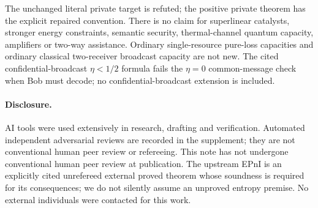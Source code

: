 \documentclass[11pt]{article}
\begin{document}
The unchanged literal private target is refuted; the positive
private theorem has the explicit repaired convention.
There is no claim for superlinear catalysts, stronger energy
constraints, semantic security, thermal-channel quantum
capacity, amplifiers or two-way assistance.
Ordinary single-resource pure-loss capacities and ordinary
classical two-receiver broadcast capacity are not new.
The cited confidential-broadcast $\eta<1/2$ formula fails
the $\eta=0$ common-message check when Bob must decode;
no confidential-broadcast extension is included.

\paragraph{Disclosure.}
AI tools were used extensively in research, drafting and verification.
Automated independent adversarial reviews are recorded in the
supplement; they are not conventional human peer review or refereeing.
This note has not undergone conventional human peer review at
publication. The upstream EPnI is an explicitly cited unrefereed
external proved theorem whose soundness is required for its
consequences; we do not silently assume an unproved entropy premise.
No external individuals were contacted for this work.
\end{document}
